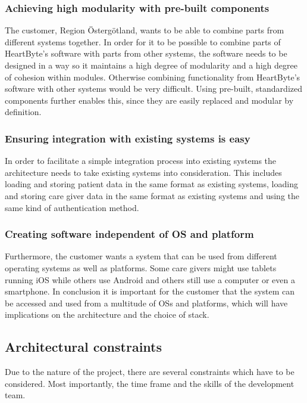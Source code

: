 \documentclass{article}
\begin{document}
\subsubsection{Achieving high modularity with pre-built components}
The customer, Region Östergötland, wants to be able to combine parts from different systems together. In order for it to be possible to combine parts of HeartByte's software with parts from other systems, the software needs to be designed in a way so it maintains a high degree of modularity and a high degree of cohesion within modules. Otherwise combining functionality from HeartByte's software with other systems would be very difficult. Using pre-built, standardized components further enables this, since they are easily replaced and modular by definition.

\subsubsection{Ensuring integration with existing systems is easy}
In order to facilitate a simple integration process into existing systems the architecture needs to take existing systems into consideration. This includes loading and storing patient data in the same format as existing systems, loading and storing care giver data in the same format as existing systems and using the same kind of authentication method.

\subsubsection{Creating software independent of OS and platform}
Furthermore, the customer wants a system that can be used from different operating systems as well as platforms. Some care givers might use tablets running iOS while others use Android and others still use a computer or even a smartphone. In conclusion it is important for the customer that the system can be accessed and used from a multitude of OSs and platforms, which will have implications on the architecture and the choice of stack. 



\subsection{Architectural constraints}
Due to the nature of the project, there are several constraints which have to be considered. Most importantly, the time frame and the skills of the development team.
\end{document}
